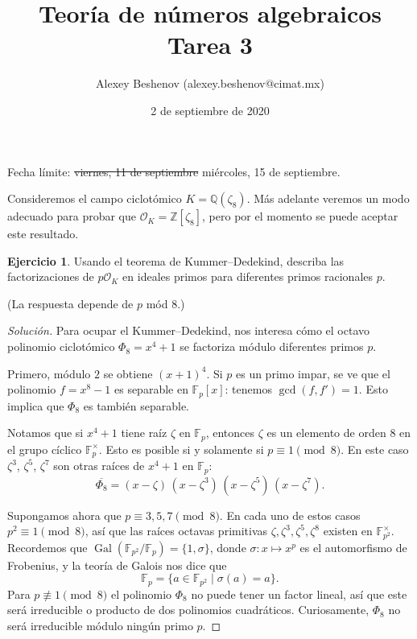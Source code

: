 \documentclass{article}
\title{Teoría de números algebraicos\\Tarea 3}
\author{Alexey Beshenov (alexey.beshenov@cimat.mx)}
\date{2 de septiembre de 2020}
\newcounter{tarea}
\theoremstyle{definition}
\newtheorem{ejercicio}{Ejercicio}[tarea]
\newenvironment{solucion}{\begin{proof}[Solución]}{\end{proof}}
\newcommand{\ZZ}{\mathbb{Z}}
\newcommand{\FF}{\mathbb{F}}
\newcommand{\QQ}{\mathbb{Q}}
\renewcommand{\O}{\mathcal{O}}
\DeclareMathOperator{\Gal}{Gal}
\begin{document}
{\sffamily\bfseries\maketitle}

\noindent Fecha límite: \sout{viernes, 11 de septiembre} miércoles, 15 de septiembre.

\ifdefined\solutions
\else
\thispagestyle{empty}
\fi

\vspace{1em}

Consideremos el campo ciclotómico $K = \QQ (\zeta_8)$.
Más adelante veremos un modo adecuado para probar que
$\O_K = \ZZ[\zeta_8]$, pero por el momento se puede aceptar este
resultado.

\begin{ejercicio}
  Usando el teorema de Kummer--Dedekind, describa las factorizaciones de
  $p \O_K$ en ideales primos para diferentes primos racionales $p$.

  \noindent (La respuesta depende de $p$ mód $8$.)

  \ifdefined\solutions
  \begin{solucion}
    Para ocupar el Kummer--Dedekind, nos interesa cómo el octavo polinomio
    ciclotómico ${\Phi_8 = x^4 + 1}$ se factoriza módulo diferentes primos $p$.

    Primero, módulo $2$ se obtiene $(x+1)^4$. Si $p$ es un primo impar, se ve
    que el polinomio $f = x^8 - 1$ es separable en $\FF_p [x]$: tenemos
    $\gcd (f,f') = 1$. Esto implica que $\Phi_8$ es también separable.

    Notamos que si $x^4 + 1$ tiene raíz $\zeta$ en $\FF_p$, entonces $\zeta$ es
    un elemento de orden $8$ en el grupo cíclico $\FF_p^\times$. Esto es posible
    si y solamente si $p \equiv 1 \pmod{8}$. En este caso $\zeta^3$, $\zeta^5$,
    $\zeta^7$ son otras raíces de $x^4 + 1$ en $\FF_p$:
    \[ \overline{\Phi_8} =
       (x - \zeta) \, (x - \zeta^3) \, (x - \zeta^5) \, (x - \zeta^7). \]

    Supongamos ahora que $p \equiv 3, 5, 7 \pmod{8}$. En cada uno de estos casos
    $p^2 \equiv 1 \pmod{8}$, así que las raíces octavas primitivas
    $\zeta, \zeta^3, \zeta^5, \zeta^8$ existen en $\FF_{p^2}^\times$. Recordemos
    que $\Gal (\FF_{p^2}/\FF_p) = \{ 1, \sigma \}$, donde
    $\sigma\colon x \mapsto x^p$ es el automorfismo de Frobenius, y la teoría de
    Galois nos dice que
    $$\FF_p = \{ a \in \FF_{p^2} \mid \sigma (a) = a \}.$$
    Para $p \not\equiv 1 \pmod{8}$ el polinomio $\Phi_8$ no puede tener un
    factor lineal, así que este será irreducible o producto de dos polinomios
    cuadráticos. Curiosamente, $\Phi_8$ no será irreducible módulo ningún primo
    $p$.


\end{solucion}
\end{ejercicio}
\end{document}
